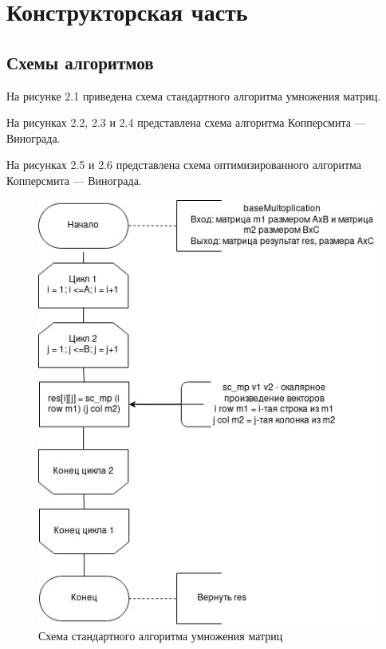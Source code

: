 \documentclass[12pt]{report}
\begin{document}
\chapter{Конструкторская часть}

\section{Схемы алгоритмов}

На рисунке 2.1 приведена схема стандартного алгоритма умножения матриц.

На рисунках 2.2, 2.3 и 2.4 представлена схема алгоритма Копперсмита — Винограда.

На рисунках 2.5 и 2.6 представлена схема оптимизированного алгоритма Копперсмита — Винограда. 

\begin{figure}[h]
	\centering
	\includegraphics[width=1\linewidth]{base.jpg}
	\caption{Схема стандартного алгоритма умножения матриц}
	\label{fig:mpr}
\end{figure}
\end{document}
